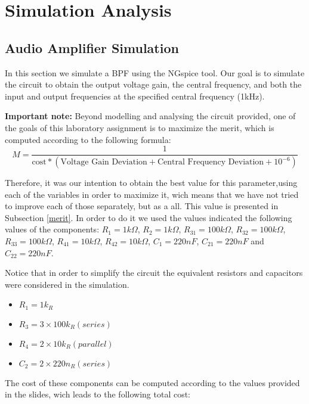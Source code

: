 \section{Simulation Analysis}
\label{sec:simulation}

\subsection{Audio Amplifier Simulation}
\label{subsec:amp_simulation}
\par In this section we simulate a BPF using the NGspice tool. Our goal is to simulate the circuit to obtain the output voltage gain, the central frequency, and both the input and output frequencies at the specified central frequency (1kHz).

\par  \textbf{Important note:} Beyond modelling and analysing the circuit provided, one of the goals of this laboratory assignment is to maximize the merit, which is computed according to the following formula:
\begin{equation}
M = \frac{1}{\text{cost}*(\text{Voltage Gain Deviation}+\text{Central Frequency Deviation}+10^{-6})}
\label{eq:merit}
\end{equation}

\par Therefore, it was our intention to obtain the best value for this parameter,using each of the variables in order to maximize it, wich means that we have not tried to improve each of those separately, but as a all. This value is presented in Subsection \ref{merit}.
In order to do it we used the values indicated the following values of the components: $R_{1}=1k\Omega$, $R_{2}=1k\Omega$, $R_{31}=100k\Omega$, $R_{32}=100k\Omega$, $R_{33}=100k\Omega$, $R_{41}=10k\Omega$, $R_{42}=10k\Omega$, $C_{1}=220nF$, $C_{21}=220nF$ and $C_{22}=220nF$. 

\par Notice that in order to simplify the circuit the equivalent resistors and capacitors were considered in the simulation.
\begin{itemize}
\item $R_{1} = 1k_{ R}$
\item $R_{3} = 3 \times 100k_{ R} (series)$
\item $R_{4} = 2 \times 10k_{ R} (parallel)$
\item $C_{2} = 2 \times 220n_{ R} (series)$
\end{itemize}

The cost of these components can be computed according to the values provided in the slides, wich leads to the following total cost:

